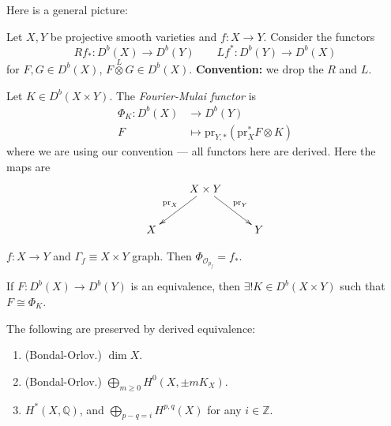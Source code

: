 \medskip\noindent
Here is a general picture:
\iffalse$$
\xymatrix{
\substack{\text{cubic 4-fold $Y$} \\ D^b(Y)}\ar[dr]&  &  
\substack{\text{moduli of} \\ \text{stable objects}\\ \text{in $\text{Ku}_Y$ as}
\\ \text{HK variety}}\\
&\substack{\text{sod K3} \\ \text{cat conditions} \\ \text{Ku}_Y }
\ar[ur]_{\substack{\text{stability} \\ \text{conditions}}}
$$\fi

\medskip\noindent
Let $X,Y$ be projective smooth varieties and $f:X\to Y$. Consider the functors
$$
Rf_*:D^b(X) \to D^b(Y)\qquad Lf^*:D^b(Y) \to D^b(X)
$$
for $F,G \in D^b(X)$, $F\overset{L}{\otimes}G \in D^b(X)$. {\bf Convention:} we
drop the $R$ and $L$.

\begin{definition}
\label{definition-}
Let $K \in D^b(X \times Y)$. The {\it Fourier-Mulai functor} is
\begin{align*}
\Phi_K: D^b(X) &\longrightarrow D^b(Y) \\
F &\longmapsto \text{pr}_{Y,*}(\text{pr}_X^*F \otimes K)
\end{align*}
where we are using our convention --- all functors here are derived. Here the
maps are
$$
\xymatrix{
& X \times Y\ar[dl]_{\text{pr}_X}\ar[dr]^{\text{pr}_Y}\\
X& & Y
}
$$
\end{definition}

\begin{example}
\label{example-Fourier-Mukai}
$f:X \to Y$ and $\Gamma_f \equiv X \times Y$ graph. Then
$\Phi_{\mathcal{O}_{p_f}}=f_*$.
\end{example}

\begin{theorem}[Orlov]
\label{theorem-Orlov}
If $F:D^b(X) \to D^b(Y)$ is an equivalence, then $\exists ! K \in D^b(X \times
Y)$ such that $F \cong \Phi_K$.
\end{theorem}

\begin{theorem}
\label{theorem-preserved-by-derived-equivalence}
The following are preserved by derived equivalence:
\begin{enumerate}
\item (Bondal-Orlov.) $\dim X$.
\item (Bondal-Orlov.) $\bigoplus_{m \geq 0}H^{0}(X,\pm m K_X)$.
\item $H^{*}(X,\mathbb{Q})$, and $\bigoplus_{p-q=i}H^{p,q}(X)$ for any $i \in
\mathbb{Z}$.
\end{enumerate}
\end{theorem}

